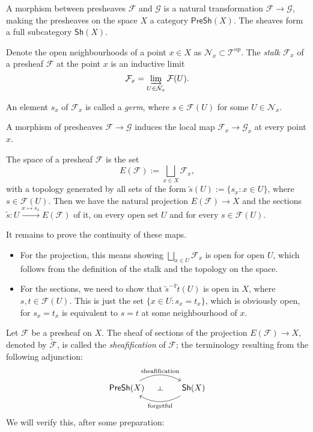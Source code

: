 \begin{definition}
    A morphism between presheaves $\mathcal{F}$ and $\mathcal{G}$ is a natural transformation $\mathcal{F}\to\mathcal{G}$, making the presheaves on the space $X$ a category $\mathsf{PreSh}(X)$. The sheaves form a full subcategory $\mathsf{Sh}(X)$.
\end{definition}

\begin{definition}
    Denote the open neighbourhoods of a point $x\in X$ as $\mathcal{N}_x\subset\mathcal{T}^\mathrm{op}$.
    The \emph{stalk} $\mathcal{F}_x$ of a presheaf $\mathcal{F}$ at the point $x$ is an inductive limit
    $$\mathcal{F}_x=\varinjlim_{U\in\mathcal{N}_x}\mathcal{F}(U).$$

    An element $s_x$ of $\mathcal{F}_x$ is called a \emph{germ}, where $s\in\mathcal{F}(U)$ for some $U\in\mathcal{N}_x$.
\end{definition}

A morphism of presheaves $\mathcal{F}\to\mathcal{G}$ induces the local map $\mathcal{F}_x\to\mathcal{G}_x$ at every point $x$.

\begin{definition}
    The \etale space of a presheaf $\mathcal{F}$ is the set
    $$E(\mathcal{F}):=\bigsqcup_{x\in X}\mathcal{F}_x,$$
    with a topology generated by all sets of the form $\tilde s(U):=\{s_x:x\in U\}$, where $s\in\mathcal{F}(U)$. Then we have the natural projection $E(\mathcal{F})\to X$ and the sections $\tilde s:U\xrightarrow{x\mapsto s_x}E(\mathcal{F})$ of it, on every open set $U$ and for every $s\in\mathcal{F}(U)$.

    It remains to prove the continuity of these maps. 
    \begin{itemize}
        \item For the projection, this means showing $\bigsqcup_{x\in U}\mathcal{F}_x$ is open for open $U$, which follows from the definition of the stalk and the topology on the \etale space.
        \item For the sections, we need to show that $\tilde s^{-1}\tilde t(U)$ is open in $X$, where $s,t\in\mathcal{F}(U)$. This is just the set $\{x\in U:s_x=t_x\}$, which is obviously open, for $s_x=t_x$ is equivalent to $s=t$ at some neighbourhood of $x$. 
    \end{itemize}
\end{definition}

\begin{theorem}[Sheafification]\label{sheafification}
    Let $\mathcal{F}$ be a presheaf on $X$. The sheaf of sections of the projection $E(\mathcal{F})\to X$, denoted by $\tilde{\mathcal{F}}$, is called the \emph{sheafification} of $\mathcal{F}$; the terminology resulting from the following adjunction:
    \[ \begin{tikzcd}[column sep=large]
        \mathsf{PreSh}(X) \arrow[r, bend left, "\text{sheafification}"{name=U}] & \mathsf{Sh}(X) \arrow[l, bend left, "\text{forgetful}"{name=D}] \arrow[phantom, from=U, to=D, sloped, "\dashv"]
    \end{tikzcd} \]
    We will verify this, after some preparation:
\end{theorem}


